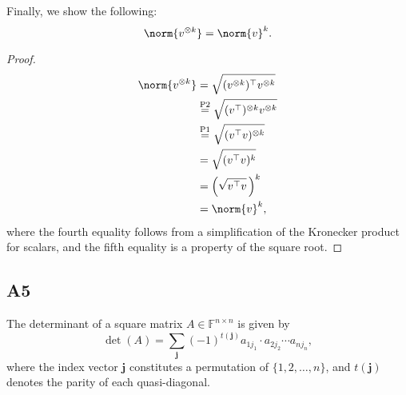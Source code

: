 \documentclass[11pt]{article}
\newcommand{\field}{\mathbb{F}} %
\newcommand{\kp}{\otimes} %
\begin{document}
Finally, we show the following:
\[
\norm{v^{\kp k}} = \norm{v}^k.
\]
\begin{proof}
\begin{align*}
\norm{v^{\kp k}} &= \sqrt{(v^{\kp k})^\top v^{\kp k}}\\
&\overset{\textnormal{P2}}{=} \sqrt{(v^\top)^{\kp k} v^{\kp k}}\\
&\overset{\textnormal{P1}}{=} \sqrt{(v^\top v)^{\kp k}}\\
&= \sqrt{(v^\top v)^k}\\
&= \Big(\sqrt{v^\top v}\,\Big)^k\\
&= \norm{v}^k,
\end{align*}
where the fourth equality follows from a simplification of the Kronecker product for scalars, and the fifth equality is a property of the square root.
\end{proof}

\subsection*{A5}
The determinant of a square matrix \(A \in \field^{n \times n}\) is given by
\[
\det(A) = \sum_{\bm{j}}(-1)^{t(\bm{j})} a_{1 j_1} \cdot a_{2 j_2} \cdots a_{n j_n},
\]
where the index vector \(\bm{j}\) constitutes a permutation of \(\{1, 2, \dots, n\}\), and \(t(\bm{j})\) denotes the parity of each quasi-diagonal.
\end{document}
